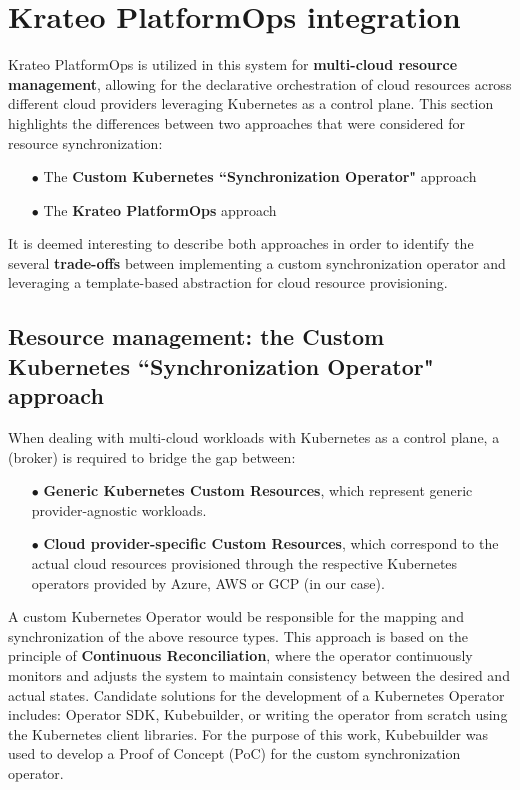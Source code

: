 \section{Krateo PlatformOps integration}

Krateo PlatformOps is utilized in this system for \textbf{multi-cloud resource management}, allowing for the declarative orchestration of cloud resources across different cloud providers leveraging Kubernetes as a control plane. 
This section highlights the differences between two approaches that were considered for resource synchronization:
\begin{itemize}[itemsep=0.2pt, topsep=1pt]
  \item[$\bullet$] The \textbf{Custom Kubernetes ``Synchronization Operator"} approach
  \item[$\bullet$] The \textbf{Krateo PlatformOps} approach
\end{itemize}

It is deemed interesting to describe both approaches in order to identify the several \textbf{trade-offs} between implementing a custom synchronization operator and leveraging a template-based abstraction for cloud resource provisioning.

\subsection{Resource management: the Custom Kubernetes ``Synchronization Operator" approach}

When dealing with multi-cloud workloads with Kubernetes as a control plane, a  (broker) is required to bridge the gap between:
\begin{itemize}[itemsep=0.2pt, topsep=1pt]
  \item[$\bullet$] \textbf{Generic Kubernetes Custom Resources}, which represent generic provider-agnostic workloads.
  \item[$\bullet$] \textbf{Cloud provider-specific Custom Resources}, which correspond to the actual cloud resources provisioned through the respective Kubernetes operators provided by Azure, AWS or GCP (in our case).
\end{itemize}

A custom Kubernetes Operator would be responsible for the mapping and synchronization of the above resource types. This approach is based on the principle of \textbf{Continuous Reconciliation}, where the operator continuously monitors and adjusts the system to maintain consistency between the desired and actual states.
Candidate solutions for the development of a Kubernetes Operator includes: Operator SDK, Kubebuilder, or writing the operator from scratch using the Kubernetes client libraries. 
For the purpose of this work, Kubebuilder was used to develop a Proof of Concept (PoC) for the custom synchronization operator.


